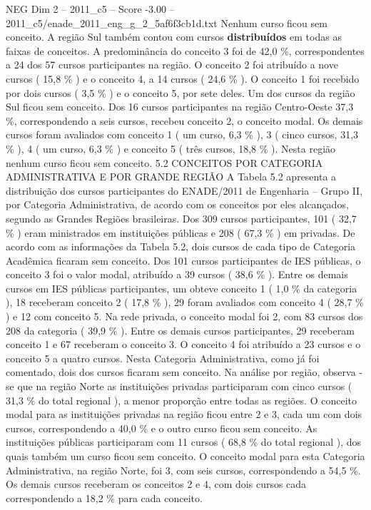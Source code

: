 \begin{textsample}{NEG Dim 2 – 2011\_c5 – Score -3.00 – 2011\_c5/enade\_2011\_eng\_g\_2\_5af6f3cb1d.txt}
Nenhum curso ficou sem conceito.
A região Sul também contou com cursos \textbf{distribuídos} em todas as faixas de conceitos.
A predominância do conceito 3 foi de 42,0 \%, correspondentes a 24 dos 57 cursos participantes na região.
O conceito 2 foi atribuído a nove cursos ( 15,8 \% ) e o conceito 4, a 14 cursos ( 24,6 \% ).
O conceito 1 foi recebido por dois cursos ( 3,5 \% ) e o conceito 5, por sete deles.
Um dos cursos da região Sul ficou sem conceito.
Dos 16 cursos participantes na região Centro-Oeste 37,3 \%, correspondendo a seis cursos, recebeu conceito 2, o conceito modal.
Os demais cursos foram avaliados com conceito 1 ( um curso, 6,3 \% ), 3 ( cinco cursos, 31,3 \% ), 4 ( um curso, 6,3 \% ) e conceito 5 ( três cursos, 18,8 \% ).
Nesta região nenhum curso ficou sem conceito. 5.2 CONCEITOS POR CATEGORIA ADMINISTRATIVA E POR GRANDE REGIÃO A Tabela 5.2 apresenta a distribuição dos cursos participantes do ENADE/2011 de Engenharia – Grupo II, por Categoria Administrativa, de acordo com os conceitos por eles alcançados, segundo as Grandes Regiões brasileiras.
Dos 309 cursos participantes, 101 ( 32,7 \% ) eram ministrados em instituições públicas e 208 ( 67,3 \% ) em privadas.
De acordo com as informações da Tabela 5.2, dois cursos de cada tipo de Categoria Acadêmica ficaram sem conceito.
Dos 101 cursos participantes de IES públicas, o conceito 3 foi o valor modal, atribuído a 39 cursos ( 38,6 \% ).
Entre os demais cursos em IES públicas participantes, um obteve conceito 1 ( 1,0 \% da categoria ), 18 receberam conceito 2 ( 17,8 \% ), 29 foram avaliados com conceito 4 ( 28,7 \% ) e 12 com conceito 5.
Na rede privada, o conceito modal foi 2, com 83 cursos dos 208 da categoria ( 39,9 \% ).
Entre os demais cursos participantes, 29 receberam conceito 1 e 67 receberam o conceito 3.
O conceito 4 foi atribuído a 23 cursos e o conceito 5 a quatro cursos.
Nesta Categoria Administrativa, como já foi comentado, dois dos cursos ficaram sem conceito.
Na análise por região, observa -se que na região Norte as instituições privadas participaram com cinco cursos ( 31,3 \% do total regional ), a menor proporção entre todas as regiões.
O conceito modal para as instituições privadas na região ficou entre 2 e 3, cada um com dois cursos, correspondendo a 40,0 \% e o outro curso ficou sem conceito.
As instituições públicas participaram com 11 cursos ( 68,8 \% do total regional ), dos quais também um curso ficou sem conceito.
O conceito modal para esta Categoria Administrativa, na região Norte, foi 3, com seis cursos, correspondendo a 54,5 \%.
Os demais cursos receberam os conceitos 2 e 4, com dois cursos cada correspondendo a 18,2 \% para cada conceito.

\end{textsample}

